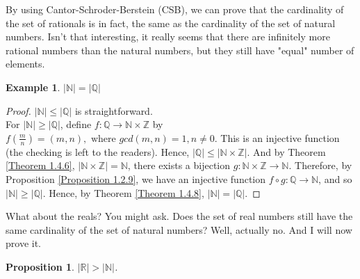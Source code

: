 \documentclass{book}
\newtheorem{example}[theorem]{Example}
\newtheorem{proposition}[theorem]{Proposition}
\begin{document}
By using Cantor-Schroder-Berstein (CSB), we can prove that the cardinality of the set of rationals is in fact, the same as the cardinality of the set of natural numbers. Isn't that interesting, it really seems that there are infinitely more rational numbers than the natural numbers, but they still have "equal" number of elements.
\begin{example}
    $|\mathbb{N}| = |\mathbb{Q}|$
\end{example}

\begin{proof}
    $|\mathbb{N}| \leq |\mathbb{Q}|$ is straightforward. \\
    For $|\mathbb{N}| \geq |\mathbb{Q}|$, define $f : \mathbb{Q} \rightarrow \mathbb{N} \times \mathbb{Z}$ by $f(\frac{m}{n}) = (m, n), \text{ where } gcd(m,n) = 1, n \neq 0$. This is an injective function (the checking is left to the readers). Hence, $|\mathbb{Q}| \leq |\mathbb{N} \times \mathbb{Z}|$. And by Theorem \ref{Theorem 1.4.6}, $|\mathbb{N} \times \mathbb{Z}| = \mathbb{N}$, there exists a bijection $g : \mathbb{N} \times \mathbb{Z} \rightarrow \mathbb{N}$. Therefore, by Proposition \ref{Proposition 1.2.9}, we have an injective function $f \circ g : \mathbb{Q} \rightarrow \mathbb{N}$, and so $|\mathbb{N}| \geq |\mathbb{Q}|$. Hence, by Theorem \ref{Theorem 1.4.8}, $|\mathbb{N}| = |\mathbb{Q}|$.
\end{proof}

What about the reals? You might ask. Does the set of real numbers still have the same cardinality of the set of natural numbers? Well, actually no. And I will now prove it.

\begin{proposition}
    $|\mathbb{R}| > |\mathbb{N}|$.
\end{proposition}
\end{document}
